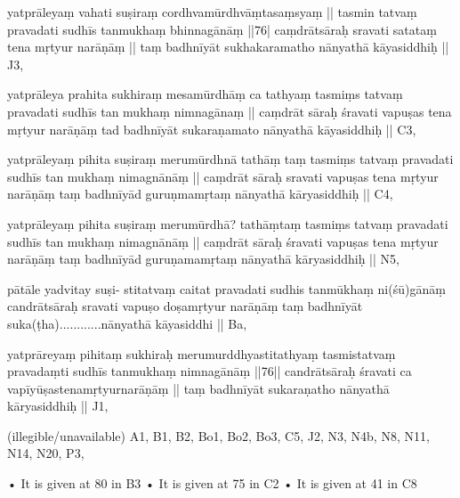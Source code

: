 \begin{marma}[hp03_049]
\item[yatprāleyaṃ vahati suṣiraṃ cordhvamūrdhvāṃtasaṃsyaṃ ||
tasmin tatvaṃ pravadati sudhīs tanmukhaṃ bhinnagānāṃ ||76|
caṃdrātsāraḥ sravati satataṃ tena mṛtyur narāṇāṃ ||
taṃ badhnīyāt sukhakaramatho nānyathā kāyasiddhiḥ ||] J3,

\item[yatprāleya prahita sukhiraṃ mesamūrdhāṃ ca tathyaṃ
tasmiṃs tatvaṃ pravadati sudhīs tan mukhaṃ nimnagānaṃ ||
caṃdrāt sāraḥ śravati vapuṣas tena mṛtyur narāṇāṃ
tad badhnīyāt sukaraṇamato nānyathā kāyasiddhiḥ ||] C3,

\item[yatprāleyaṃ pihita suṣiraṃ merumūrdhnā tathāṃ taṃ
tasmiṃs tatvaṃ pravadati sudhīs tan mukhaṃ nimagnānāṃ ||
caṃdrāt sāraḥ sravati vapuṣas tena mṛtyur narāṇāṃ
taṃ badhnīyād guruṇmamṛtaṃ nānyathā kāryasiddhiḥ ||] C4,

\item[yatprāleyaṃ pihita suṣiraṃ merumūrdhā? tathāṃtaṃ
tasmiṃs tatvaṃ pravadati sudhīs tan mukhaṃ nimagnānāṃ ||
caṃdrāt sāraḥ śravati vapuṣas tena mṛtyur narāṇāṃ
taṃ badhnīyād guruṇamamṛtaṃ nānyathā kāryasiddhiḥ ||] N5,

\item[pātāle yadvitay suṣi-
stitatvaṃ caitat pravadati sudhis tanmūkhaṃ ni(śū)gānāṃ
candrātsāraḥ sravati vapuṣo doṣamṛtyur narāṇāṃ 
taṃ badhnīyāt suka(ṭha)............nānyathā kāyasiddhi ||] Ba, 

\item[yatprāreyaṃ pihitaṃ sukhiraḥ merumurddhyastitathyaṃ
tasmistatvaṃ pravadaṃti sudhīs tanmukhaṃ nimnagānāṃ ||76||
candrātsāraḥ śravati ca vapīyūṣastenamṛtyurnarāṇāṃ ||
taṃ badhnīyāt sukaraṇatho nānyathā kāryasiddhiḥ ||] J1, 

\item[(illegible/unavailable)] A1, B1, B2, Bo1, Bo2, Bo3, C5, J2, N3, N4b, N8, N11, N14, N20, P3,

  \begin{description}
    • It is given at 80 in B3
    • It is given at 75 in C2
    • It is given at 41 in C8
    \end{description}

  \end{marma}

